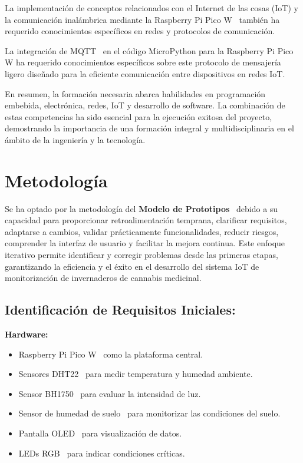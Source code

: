 La implementación de conceptos relacionados con el Internet de las cosas (IoT) y la comunicación inalámbrica mediante la Raspberry Pi Pico W~\cite{misc:RPiPicoW} también ha requerido conocimientos específicos en redes y protocolos de comunicación.

La integración de MQTT~\cite{manual:MQTT} en el código MicroPython para la Raspberry Pi Pico W ha requerido conocimientos específicos sobre este protocolo de mensajería ligero diseñado para la eficiente comunicación entre dispositivos en redes IoT.

En resumen, la formación necesaria abarca habilidades en programación embebida, electrónica, redes, IoT y desarrollo de software. La combinación de estas competencias ha sido esencial para la ejecución exitosa del proyecto, demostrando la importancia de una formación integral y multidisciplinaria en el ámbito de la ingeniería y la tecnología.
\pagebreak

\section{Metodología}
Se ha optado por la metodología del \textbf{Modelo de Prototipos}~\cite{misc:Metodologia_ModeloDePrototipos} debido a su capacidad para proporcionar retroalimentación temprana, clarificar requisitos, adaptarse a cambios, validar prácticamente funcionalidades, reducir riesgos, comprender la interfaz de usuario y facilitar la mejora continua. Este enfoque iterativo permite identificar y corregir problemas desde las primeras etapas, garantizando la eficiencia y el éxito en el desarrollo del sistema IoT de monitorización de invernaderos de cannabis medicinal.

\subsection{Identificación de Requisitos Iniciales:}
\textbf{Hardware:}
\begin{itemize}
	\item Raspberry Pi Pico W~\cite{misc:RPiPicoW} como la plataforma central.
	\item Sensores DHT22~\cite{manual:DHT22} para medir temperatura y humedad ambiente.
	\item Sensor BH1750~\cite{manual:BH1750} para evaluar la intensidad de luz.
	\item Sensor de humedad de suelo~\cite{wiki:SensorHumedadSuelo} para monitorizar las condiciones del suelo.
	\item Pantalla OLED~\cite{manual:Oled} para visualización de datos.
	\item LEDs RGB~\cite{manual:LedRGB} para indicar condiciones críticas.
\end{itemize}

